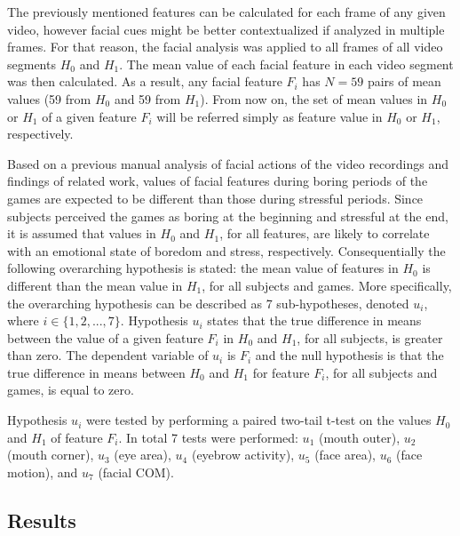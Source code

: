 The previously mentioned features can be calculated for each frame of any given video, however facial cues might be better contextualized if analyzed in multiple frames. For that reason, the facial analysis was applied to all frames of all video segments $H_0$ and $H_1$. The mean value of each facial feature in each video segment was then calculated. As a result, any facial feature $F_i$ has $N=59$ pairs of mean values (59 from $H_0$ and 59 from $H_1$). From now on, the set of mean values in $H_0$ or $H_1$ of a given feature $F_i$ will be referred simply as feature value in $H_0$ or $H_1$, respectively.

Based on a previous manual analysis of facial actions of the video recordings \parencite{bevilacqua2016variations} and findings of related work, values of facial features during boring periods of the games are expected to be different than those during stressful periods. Since subjects perceived the games as boring at the beginning and stressful at the end, it is assumed that values in $H_0$ and $H_1$, for all features, are likely to correlate with an emotional state of boredom and stress, respectively. Consequentially the following overarching hypothesis is stated: the mean value of features in $H_0$ is different than the mean value in $H_1$, for all subjects and games. More specifically, the overarching hypothesis can be described as 7 sub-hypotheses, denoted $u_i$, where $i \in \{1, 2, ..., 7\}$. Hypothesis $u_i$ states that the true difference in means between the value of a given feature $F_i$ in $H_0$ and $H_1$, for all subjects, is greater than zero. The dependent variable of $u_i$ is $F_i$ and the null hypothesis is that the true difference in means between $H_0$ and $H_1$ for feature $F_i$, for all subjects and games, is equal to zero.

Hypothesis $u_i$ were tested by performing a paired two-tail t-test on the values $H_0$ and $H_1$ of feature $F_i$. In total 7 tests were performed: $u_1$ (mouth outer), $u_2$ (mouth corner), $u_3$ (eye area), $u_4$ (eyebrow activity), $u_5$ (face area), $u_6$ (face motion), and $u_7$ (facial COM).

\subsection{Results}

